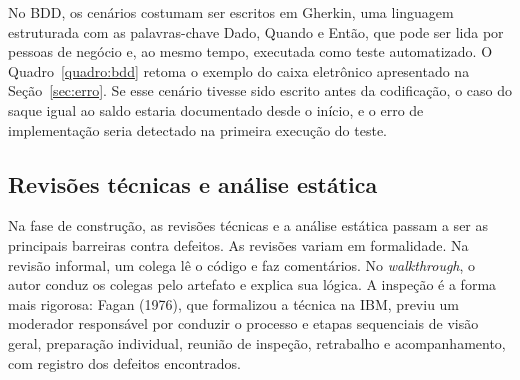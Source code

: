 \documentclass[12pt,a4paper]{article}
\newcommand{\fonte}[1]{\vspace{0.2cm}{\small Fonte: #1}}
\begin{document}
No BDD, os cenários costumam ser escritos em Gherkin, uma linguagem estruturada com as palavras-chave Dado, Quando e Então, que pode ser lida por pessoas de negócio e, ao mesmo tempo, executada como teste automatizado. O Quadro~\ref{quadro:bdd} retoma o exemplo do caixa eletrônico apresentado na Seção~\ref{sec:erro}. Se esse cenário tivesse sido escrito antes da codificação, o caso do saque igual ao saldo estaria documentado desde o início, e o erro de implementação seria detectado na primeira execução do teste.

\begin{table}[htbp]
\centering
\caption{Cenário de aceitação escrito em Gherkin}
\label{quadro:bdd}

\fonte{elaborado pelo autor.}
\end{table}

\subsection{Revisões técnicas e análise estática}

Na fase de construção, as revisões técnicas e a análise estática passam a ser as principais barreiras contra defeitos. As revisões variam em formalidade. Na revisão informal, um colega lê o código e faz comentários. No \textit{walkthrough}, o autor conduz os colegas pelo artefato e explica sua lógica. A inspeção é a forma mais rigorosa: Fagan (1976), que formalizou a técnica na IBM, previu um moderador responsável por conduzir o processo e etapas sequenciais de visão geral, preparação individual, reunião de inspeção, retrabalho e acompanhamento, com registro dos defeitos encontrados.
\end{document}

